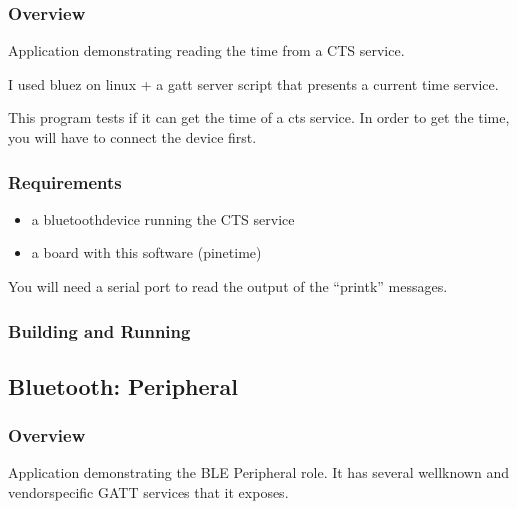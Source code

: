 \documentclass[letterpaper,10pt,english]{sphinxmanual}
\begin{document}
\subsubsection{Overview}
\label{\detokenize{samples/bluetooth/peripheral-cts/README:overview}}
Application demonstrating reading the time from a CTS service.

I used bluez on linux + a gatt server script that presents a current time service.

This program tests if it can get the time of a cts service. In order to get the time, you will have to connect the device first.


\subsubsection{Requirements}
\label{\detokenize{samples/bluetooth/peripheral-cts/README:requirements}}\begin{itemize}
\item {} 
a bluetoothdevice running the CTS service

\item {} 
a board with this software (pinetime)

\end{itemize}

You will need a serial port to read the output of the “printk” messages.


\subsubsection{Building and Running}
\label{\detokenize{samples/bluetooth/peripheral-cts/README:building-and-running}}

\subsection{Bluetooth: Peripheral}
\label{\detokenize{samples/bluetooth/peripheral/README:bluetooth-peripheral}}\label{\detokenize{samples/bluetooth/peripheral/README:ble-peripheral}}\label{\detokenize{samples/bluetooth/peripheral/README::doc}}

\subsubsection{Overview}
\label{\detokenize{samples/bluetooth/peripheral/README:overview}}
Application demonstrating the BLE Peripheral role. It has several well\sphinxhyphen{}known and
vendor\sphinxhyphen{}specific GATT services that it exposes.
\end{document}
